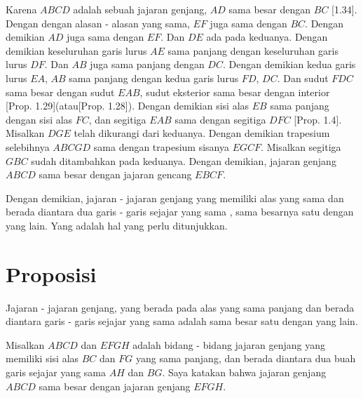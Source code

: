 \documentclass[a4paper]{book}
\begin{document}
Karena $ABCD$ adalah sebuah jajaran genjang, $AD$ sama besar dengan $BC$ 
[1.34].  Dengan dengan alasan - alasan yang sama, $EF$ juga sama dengan 
$BC$.  Dengan demikian $AD$ juga sama dengan $EF$. Dan $DE$ ada pada keduanya.
Dengan demikian keseluruhan garis lurus $AE$ sama panjang dengan keseluruhan
garis lurus $DF$. Dan $AB$ juga sama panjang dengan $DC$. Dengan demikian 
kedua garis lurus $EA$, $AB$ sama panjang dengan kedua garis lurus $FD$, $DC$.
Dan sudut $FDC$ sama besar dengan sudut $EAB$, sudut eksterior sama besar 
dengan interior [Prop. 1.29](atau[Prop. 1.28]). Dengan demikian sisi alas $EB$ 
sama panjang dengan sisi alas $FC$, dan segitiga $EAB$ sama dengan segitiga 
$DFC$ [Prop. 1.4]. Misalkan $DGE$ telah dikurangi dari keduanya. Dengan demikian
trapesium selebihnya $ABCGD$ sama dengan trapesium sisanya $EGCF$. Misalkan
segitiga $GBC$ sudah ditambahkan pada keduanya. Dengan demikian, jajaran 
genjang $ABCD$ sama besar dengan jajaran gencang $EBCF$.

Dengan demikian, jajaran - jajaran genjang yang memiliki alas yang sama dan 
berada diantara dua garis - garis sejajar yang sama , sama besarnya satu 
dengan yang lain.  Yang adalah hal yang perlu ditunjukkan.

\section*{\centering Proposisi \thesection} 
Jajaran - jajaran genjang, yang berada pada alas yang sama panjang dan berada
diantara garis - garis sejajar yang sama adalah sama besar satu dengan yang 
lain.
\begin{center}
\end{center}
Misalkan $ABCD$ dan $EFGH$ adalah bidang - bidang jajaran genjang yang memiliki
sisi alas $BC$ dan $FG$ yang sama panjang, dan berada diantara dua buah garis
sejajar yang sama $AH$ dan $BG$. Saya katakan bahwa jajaran genjang $ABCD$ sama
besar dengan jajaran genjang $EFGH$.
\end{document}
